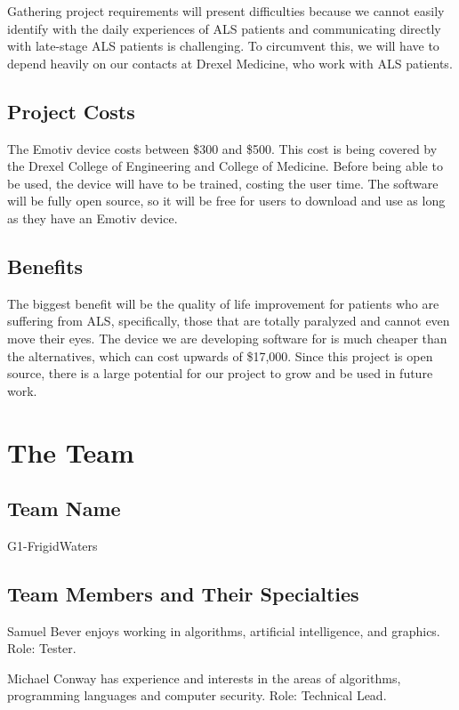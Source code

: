\documentclass{report}
\begin{document}
Gathering project requirements will present difficulties because we cannot
easily identify with the daily experiences of ALS patients and communicating
directly with late-stage ALS patients is challenging. To circumvent this, we
will have to depend heavily on our contacts at Drexel Medicine, who work
with ALS patients.

\subsection*{Project Costs}
The Emotiv device\cite{Emotiv} costs between \$300 and \$500. This cost is
being covered by the Drexel College of Engineering and College of Medicine.
Before being able to be used, the device will have to be trained, costing the
user time. The software will be fully open source, so it will be free for
users to download and use as long as they have an Emotiv device.

\subsection*{Benefits}
The biggest benefit will be the quality of life improvement for patients who
are suffering from ALS, specifically, those that are totally paralyzed and
cannot even move their eyes. The device we are developing software for is
much cheaper than the alternatives, which can cost upwards of \$17,000.
Since this project is open source, there is a large potential for our
project to grow and be used in future work.

\newpage
\section*{\centering The Team}

\subsection*{Team Name}

G1-FrigidWaters

\subsection*{Team Members and Their Specialties}

Samuel Bever enjoys working in algorithms, artificial intelligence, and
graphics. Role: Tester.

Michael Conway has experience and interests in the areas of algorithms,
programming languages and computer security. Role: Technical Lead.
\end{document}
